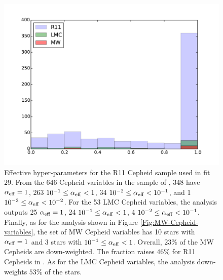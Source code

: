 \begin{figure}[hbtp]
\centering
\includegraphics[scale=.75]{figures/chapter-h0/effective_HP_histogram.pdf}
\caption{Effective hyper-parameters for the R11 Cepheid sample used in fit $29$. From the 646 Cepheid variables in the sample of \cite{Riess:2011yx}, 348 have $\alpha_{\mathrm{eff}}=1$, 263 $10^{-1}\leq \alpha_{\mathrm{eff}} < 1$, 34  $10^{-2}\leq \alpha_{\mathrm{eff}} < 10^{-1}$, and 1 $10^{-3} \leq \alpha_{\mathrm{eff}} < 10^{-2}$. For the 53 LMC Cepheid variables, the analysis outputs 25 $\alpha_{\mathrm{eff}}=1$, 24 $10^{-1}\leq \alpha_{\mathrm{eff}} < 1$, 4  $10^{-2}\leq \alpha_{\mathrm{eff}} < 10^{-1}$. Finally, as for the analysis shown in Figure \ref{Fig:MW-Cepheid-variables}, the set of MW Cepheid variables has 10 stars with $\alpha_{\mathrm{eff}}=1$ and 3 stars with $10^{-1}\leq \alpha_{\mathrm{eff}} < 1$. Overall, $23\%$ of the MW Cepheids are down-weighted. The fraction raises $46\%$ for R11 Cepheids in \cite{Riess:2011yx}. As for the LMC Cepheid variables, the analysis down-weights $53\%$ of the stars.}
\label{Fig:effective-HP-fitM1a}
\end{figure}

